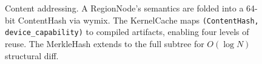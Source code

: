 \begin{figure}[ht]
\caption{Content addressing.
  A RegionNode's semantics are folded into a 64-bit ContentHash via wymix.
  The KernelCache maps \texttt{(ContentHash, device\_capability)} to compiled
  artifacts, enabling four levels of reuse.
  The MerkleHash extends to the full subtree for $O(\log N)$ structural diff.}
\label{fig:content-addressing}
\end{figure}
